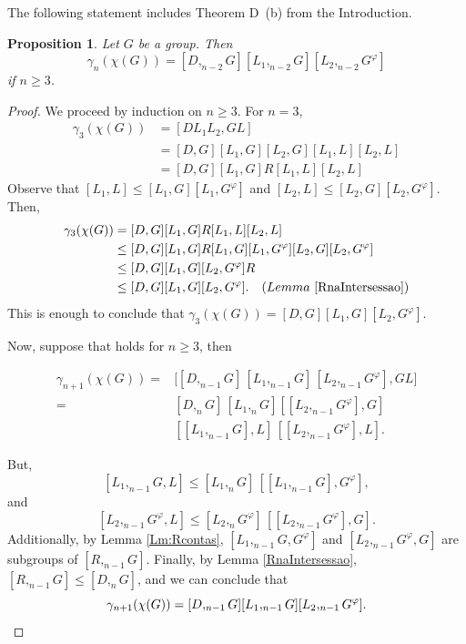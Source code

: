 \documentclass[12pt,leqno]{amsart}
\newtheorem{prop}[theorem]{\sc Proposition}
\begin{document}
The following statement includes Theorem D~(b) from the Introduction. 

\begin{prop}\label{EstruturaGamma(chi)}
     Let $G$ be a group. Then
    \[
\gamma_n(\chi(G))= [D,_{n-2}G][L_1,_{n-2}G][L_2,_{n-2}G^{\varphi}]
    \]
    if $n\geq 3$.
\end{prop}

\begin{proof}
    We proceed by induction on $n \geq 3$. For $n=3$,
\begin{align*}
    \gamma_3(\chi(G))&=[DL_1L_2,GL]\\
    &= [D,G][L_1,G][L_2,G][L_1,L][L_2,L]\\
    &= [D,G][L_1,G]R[L_1,L][L_2,L]
\end{align*}
Observe that $[L_1,L]\leq [L_1,G][L_1,G^{\varphi}] $ and $[L_2,L]\leq [L_2,G][L_2,G^{\varphi}]$. Then,
\begin{align*}
    \gamma_3(\chi(G))&= [D,G][L_1,G]R[L_1,L][L_2,L]\\
    &\leq [D,G][L_1,G]R [L_1,G][L_1,G^{\varphi}] [L_2,G][L_2,G^{\varphi}]\\ 
    &\leq [D,G][L_1,G][L_2,G^{\varphi}]R \\
    &\leq [D,G][L_1,G][L_2,G^{\varphi}]. \ \ \ (Lemma \ \ref{RnaIntersessao})
\end{align*}
This is enough to conclude that $\gamma_3(\chi(G))=[D,G][L_1,G][L_2,G^{\varphi}].$

    Now, suppose that holds for $n\geq 3$, then

 \begin{align*}
    \gamma_{n+1}(\chi(G))=&\big[[D,_{n-1}G]\,[L_1,_{n-1}G]\,[L_2,_{n-1}G^{\varphi}],GL\big]\\
    =&[D,_{n}G]\,[L_1,_{n}G]  
     [[L_2,_{n-1}G^{\varphi}],G]\\
     &[[L_1,_{n-1}G],L]\,[[L_2,_{n-1}G^{\varphi}],L].
\end{align*}   

But, 
\[
[L_1,_{n-1}G,L]\leq [L_1,_{n}G]\,[[L_1,_{n-1}G],G^{\varphi}],
\]
and 
\[
[L_2,_{n-1}G^{\varphi},L]\leq [L_2,_{n}G^{\varphi}]\, [[L_2,_{n-1}G^{\varphi}],G].
\]
Additionally, by Lemma \ref{Lm:Rcontas}, $[L_1,_{n-1}G,G^{\varphi}]$ and $[L_2,_{n-1}G^{\varphi},G]$ are subgroups of $  [R,_{n-1}G]$. Finally, 
by Lemma \ref{RnaIntersessao}, $[R,_{n-1}G]\leq [D,_{n}G]$, and we can conclude that 
\[
\gamma_{n+1}(\chi(G))=[D,_{n-1}G][L_1,_{n-1}G][L_2,_{n-1}G^{\varphi}].  \qedhere
\] 
\end{proof}
\end{document}
